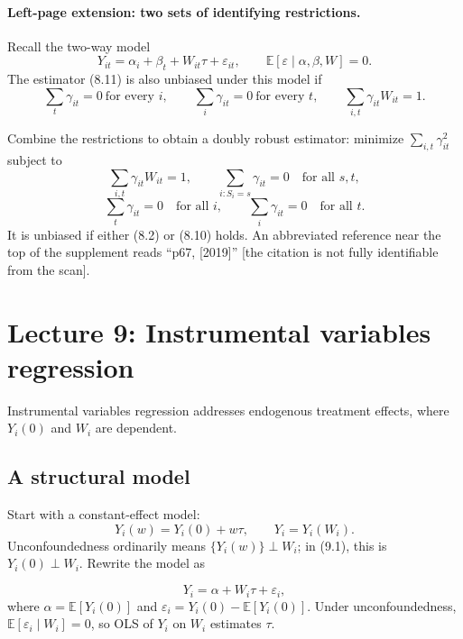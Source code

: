\paragraph{Left-page extension: two sets of identifying restrictions.}
Recall the two-way model
\[
 Y_{it}=\alpha_i+\beta_t+W_{it}\tau+\varepsilon_{it},
 \qquad\mathbb E[\varepsilon\mid\alpha,\beta,W]=0.\tag{8.2, recalled}
\]
The estimator (8.11) is also unbiased under this model if
\[
 \sum_t\gamma_{it}=0\ \text{for every }i,
 \qquad\sum_i\gamma_{it}=0\ \text{for every }t,
 \qquad\sum_{i,t}\gamma_{it}W_{it}=1.
\]

Combine the restrictions to obtain a doubly robust estimator: minimize $\sum_{i,t}\gamma_{it}^2$ subject to
\[
 \sum_{i,t}\gamma_{it}W_{it}=1,
 \qquad\sum_{i:S_i=s}\gamma_{it}=0\quad\text{for all }s,t,
\]
\[
 \sum_t\gamma_{it}=0\quad\text{for all }i,
 \qquad\sum_i\gamma_{it}=0\quad\text{for all }t.
\]
It is unbiased if either (8.2) or (8.10) holds. An abbreviated reference near the top of the supplement reads ``p67, [2019]'' [the citation is not fully identifiable from the scan].

\section{Lecture 9: Instrumental variables regression}
Instrumental variables regression addresses endogenous treatment effects, where $Y_i(0)$ and $W_i$ are dependent.

\subsection{A structural model}
Start with a constant-effect model:
\[
 Y_i(w)=Y_i(0)+w\tau,\qquad Y_i=Y_i(W_i).\tag{9.1}
\]
Unconfoundedness ordinarily means $\{Y_i(w)\}\perp W_i$; in (9.1), this is $Y_i(0)\perp W_i$. Rewrite the model as

\[
 Y_i=\alpha+W_i\tau+\varepsilon_i,\tag{9.2}
\]
where $\alpha=\mathbb E[Y_i(0)]$ and $\varepsilon_i=Y_i(0)-\mathbb E[Y_i(0)]$. Under unconfoundedness, $\mathbb E[\varepsilon_i\mid W_i]=0$, so OLS of $Y_i$ on $W_i$ estimates $\tau$.

